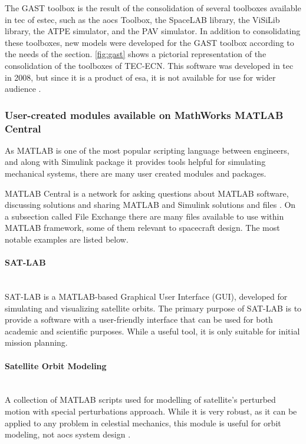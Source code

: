         The GAST toolbox is the result of the consolidation of several toolboxes available in \ac{tec} of \ac{estec}, such as the \ac{aocs} Toolbox, the SpaceLAB library, the ViSiLib library, the ATPE simulator, and the PAV simulator. In addition to consolidating these toolboxes, new models were developed for the GAST toolbox according to the needs of the section. \autoref{fig:gast} shows a pictorial representation of the consolidation of the toolboxes of TEC-ECN. This software was developed in \ac{tec} in 2008, but since it is a product of \ac{esa}, it is not available for use for wider audience \cite{gast}.

    \subsubsection{User-created modules available on MathWorks MATLAB Central}
    As MATLAB is one of the most popular scripting language between engineers, and along with Simulink package it provides tools helpful for simulating mechanical systems, there are many user created modules and packages.
    
    MATLAB Central is a network for asking questions about MATLAB software, discussing solutions and sharing MATLAB and Simulink solutions and files \cite{matlabcentral}. On a subsection called File Exchange there are many files available to use within MATLAB framework, some of them relevant to spacecraft design. The most notable examples are listed below.

        \paragraph*{SAT-LAB}\hspace{0pt}\\
            SAT-LAB is a MATLAB-based Graphical User Interface (GUI), developed for simulating and visualizing satellite orbits. The primary purpose of SAT-LAB is to provide a software with a user-friendly interface that can be used for both academic and scientific purposes. While a useful tool, it is only suitable for initial mission planning\cite{satlab}.

        \paragraph*{Satellite Orbit Modeling}\hspace{0pt}\\
            A collection of MATLAB scripts used for modelling of satellite's perturbed motion with special perturbations approach. While it is very robust, as it can be applied to any problem in celestial mechanics, this module is useful for orbit modeling, not \ac{aocs} system design \cite{som-matlab}.
            
